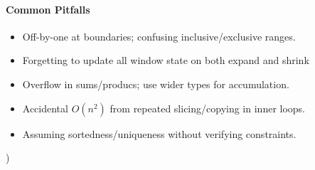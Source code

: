 \paragraph{Common Pitfalls}
\begin{itemize}[nosep]
  \item Off-by-one at boundaries; confusing inclusive/exclusive ranges.
  \item Forgetting to update all window state on both expand and shrink
  \item Overflow in sums/producs; use wider types for accumulation.
  \item Accidental $O(n^2)$ from repeated slicing/copying in inner loops.
  \item Assuming sortedness/uniqueness without verifying constraints.
\end{itemize}

)

% 

% 
